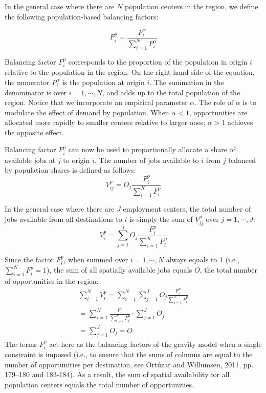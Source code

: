 \documentclass[]{elsarticle} %
\begin{document}
In the general case where there are \(N\) population centers in the
region, we define the following population-based balancing factors:

\begin{equation}
\label{eq:population-balancing-factor}
F^p_{i} = \frac{P_{i}^\alpha}{\sum_{i=1}^N P_{i}^\alpha}
\end{equation}

Balancing factor \(F^p_{i}\) corresponds to the proportion of the
population in origin \(i\) relative to the population in the region. On
the right hand side of the equation, the numerator \(P_{i}^\alpha\) is
the population at origin \(i\). The summation in the denominator is over
\(i=1,\cdots,N\), and adds up to the total population of the region.
Notice that we incorporate an empirical parameter \(\alpha\). The role
of \(\alpha\) is to modulate the effect of demand by population. When
\(\alpha <1\), opportunities are allocated more rapidly to smaller
centers relative to larger ones; \(\alpha>1\) achieves the opposite
effect.

Balancing factor \(F^p_{i}\) can now be used to proportionally allocate
a share of available jobs at \(j\) to origin \(i\). The number of jobs
available to \(i\) from \(j\) balanced by population shares is defined
as follows: \[
V^p_{ij} = O_j\frac{F^p_{i}}{\sum_{i=1}^K F^p_{i}}
\]

In the general case where there are \(J\) employment centers, the total
number of jobs available from all destinations to \(i\) is simply the
sum of \(V^p_{ij}\) over \(j=1,\cdots, J\): \[
V^p_{i} = \sum_{j=1}^J O_j\frac{F^p_{i}}{\sum_{i=1}^K F^p_{i}}
\]

Since the factor \(F^p_{i}\), when summed over \(i=1,\cdots,N\) always
equals to 1 (i.e., \(\sum_{i=1}^{N} F^p_{i} = 1\)), the sum of all
spatially available jobs equals \(O\), the total number of opportunities
in the region: \[
\begin{array}{l}
\sum_{i=1}^N V^p_i =\sum_{i=1}^N\sum_{j=1}^JO_j\frac{F^p_{i}}{\sum_{i=1}^N F^p_{i}}\\
=\sum_{i=1}^N \frac{F^p_{i}}{\sum_{i=1}^N F^p_{i}}\cdot\sum_{j=1}^JO_j\\
=\sum_{j=1}^J O_j = O
\end{array}
\] The terms \(F^p_{i}\) act here as the balancing factors of the
gravity model when a single constraint is imposed (i.e., to ensure that
the sums of columns are equal to the number of opportunities per
destination, see Ortúzar and Willumsen, 2011, pp. 179--180 and 183-184).
As a result, the sum of spatial availability for all population centers
equals the total number of opportunities.
\end{document}
